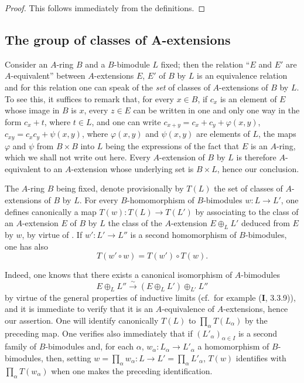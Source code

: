 \begin{proof}
This follows immediately from the definitions.
\end{proof}

\subsection{The group of classes of A-extensions}
\label{subsection:0.18.3}

\begin{env}[18.3.1]
\label{0.18.3.1}
Consider an $A$-ring $B$ and a $B$-bimodule $L$ fixed; then the relation ``$E$ and $E'$ are $A$-equivalent'' between $A$-extensions $E$, $E'$ of $B$ by $L$ is an equivalence relation and for this relation one can speak of the \emph{set} of classes of $A$-extensions of $B$ by $L$.
To see this, it suffices to remark that, for every $x\in B$, if $c_x$ is an element of $E$ whose image in $B$ is $x$, every $z\in E$ can be written in one and only one way in the form $c_x+t$, where $t\in L$, and one can write $c_{x+y}=c_x+c_y+\varphi(x,y)$, $c_{xy}=c_x c_y+\psi(x,y)$, where $\varphi(x,y)$ and $\psi(x,y)$ are elements of $L$, the maps $\varphi$ and $\psi$ from $B\times B$ into $L$ being the expressions of the fact that $E$ is an $A$-ring, which we shall not write out here.
Every $A$-extension of $B$ by $L$ is therefore $A$-equivalent to an $A$-extension whose underlying set is $B\times L$, hence our conclusion.
\end{env}

\begin{env}[18.3.2]
\label{0.18.3.2}
The $A$-ring $B$ being fixed, denote provisionally by $T(L)$ the set of classes of $A$-extensions of $B$ by $L$.
For every $B$-homomorphism of $B$-bimodules $w:L\to L'$, one defines canonically a map $T(w):T(L)\to T(L')$ by associating to the class of an $A$-extension $E$ of $B$ by $L$ the class of the $A$-extension $E\oplus_L L'$ deduced from $E$ by $w$, by virtue of .
If $w':L'\to L''$ is a second homomorphism of $B$-bimodules, one has also
\begin{equation}
\tag{18.3.2.1}
  \label{0.18.3.2.1}
  T(w'\circ w)=T(w')\circ T(w).
\end{equation}

Indeed, one knows that there exists a canonical isomorphism of $A$-bimodules
\[
  E\oplus_L L''\xrightarrow{\sim}(E\oplus_L L')\oplus_{L'} L''
\]
by virtue of the general properties of inductive limits (cf.\ for example ($\mathbf{I}$, 3.3.9)), and it is immediate to verify that it is an $A$-equivalence of $A$-extensions, hence our assertion.
One will identify canonically $T(L)$ to $\prod_\alpha T(L_\alpha)$ by the preceding map.
One verifies also immediately that if $(L'_\alpha)_{\alpha\in I}$ is a second family of $B$-bimodules and, for each $\alpha$, $w_\alpha:L_\alpha\to L'_\alpha$ a homomorphism of $B$-bimodules, then, setting $w=\prod_\alpha w_\alpha:L\to L'=\prod_\alpha L'_\alpha$, $T(w)$ identifies with $\prod_\alpha T(w_\alpha)$ when one makes the preceding identification.
\end{env}

